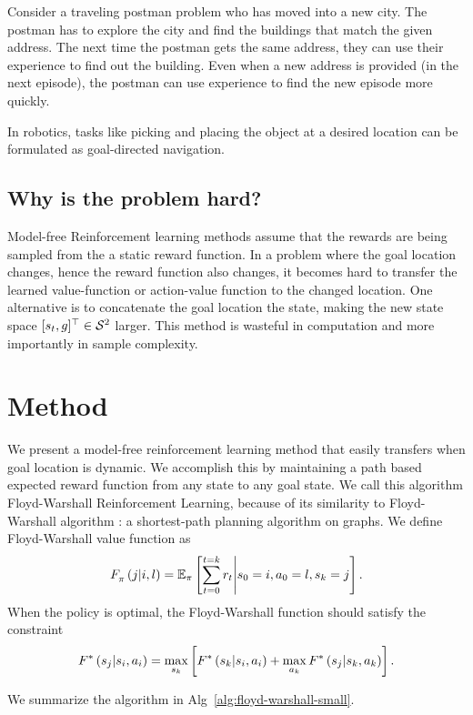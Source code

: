 Consider a traveling postman problem who has moved into a new city. The
postman has to explore the city and find the buildings that match the
given address.  The next time the postman gets the same address, they
can use their experience to find out the building.  Even when a new
address is provided (in the next episode), the postman can use
experience to find the new episode more quickly.

In robotics, tasks like picking and placing the object at a desired
location can be formulated as goal-directed navigation.

\subsection{Why is the problem hard?}
Model-free Reinforcement learning methods assume that the rewards are
being sampled from the a static reward function.  In a problem where the
goal location changes, hence the reward function also changes, it
becomes hard to transfer the learned value-function or action-value
function to the changed location.  One alternative is to concatenate the
goal location the state, making the new state space $[\state_t,
\goal]^\top \in \State^2$ larger.  This method is wasteful in
computation and more importantly in sample complexity.

\section{Method}
We present a model-free reinforcement learning method that easily
transfers when goal location is dynamic.  We accomplish this by
maintaining a path based expected reward function from any state to any
goal state.  We call this algorithm Floyd-Warshall Reinforcement
Learning, because of its similarity to Floyd-Warshall algorithm : a
shortest-path planning algorithm on graphs.  We define Floyd-Warshall
value function as
%
\begin{align}
\fwargs{i}{l}{j}{\policy}{} =
\E_{\policy}\left[ \sum_{t=0}^{t=k} \rew_t \middle\vert \state_0 = i, \act_0 = l, \state_k = j \right] .
\end{align}%
%
When the policy is optimal, the Floyd-Warshall function should satisfy the constraint
%
\begin{align}
\fwargs{\state_i}{\act_i}{\state_j}{}{*}
 = \max_{\state_k} \left[
\fwargs{\state_i}{\act_i}{\state_k}{}{*}
+ \max_{\act_k}\fwargs{\state_k}{\act_k}{\state_j}{}{*} \right] .
\end{align}%
%

We summarize the algorithm in Alg~\ref{alg:floyd-warshall-small}.



